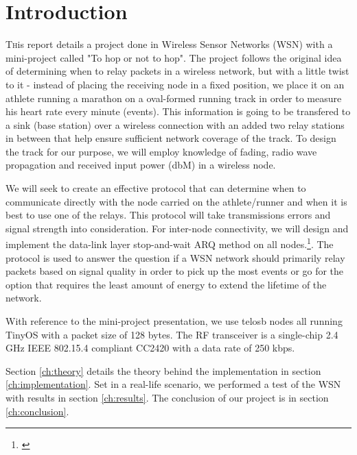 \section{Introduction}\label{ch:introduction}

\lettrine[nindent=0em,lines=3]{T} his report details a project done in Wireless Sensor Networks (WSN) with a mini-project called "To hop or not to hop". The project follows the original idea of determining when to relay packets in a wireless network, but with a little twist to it - instead of placing the receiving node in a fixed position, we place it on an athlete running a marathon on a oval-formed running track in order to measure his heart rate every minute (events). This information is going to be transfered to a sink (base station) over a wireless connection with an added two relay stations in between that help ensure sufficient network coverage of the track. To design the track for our purpose, we will employ knowledge of fading, radio wave propagation and received input power (dbM) in a wireless node.

\noindent We will seek to create an effective protocol that can determine when to communicate directly with the node carried on the athlete/runner and when it is best to use one of the relays. This protocol will take transmissions errors and signal strength into consideration. For inter-node connectivity, we will design and implement the data-link layer stop-and-wait ARQ method on all nodes.\footnote{\cite{Ieee}}. The protocol is used to answer the question if a WSN network should primarily relay packets based on signal quality in order to pick up the most events or go for the option that requires the least amount of energy to extend the lifetime of the network.

\noindent With reference to the mini-project presentation, we use telosb nodes all running TinyOS with a packet size of 128 bytes. The RF transceiver is a single-chip 2.4 GHz IEEE 802.15.4 compliant CC2420 with a data rate of 250 kbps.

\noindent Section \ref{ch:theory} details the theory behind the implementation in section \ref{ch:implementation}. Set in a real-life scenario, we performed a test of the WSN with results in section \ref{ch:results}. The conclusion of our project is in section \ref{ch:conclusion}.

